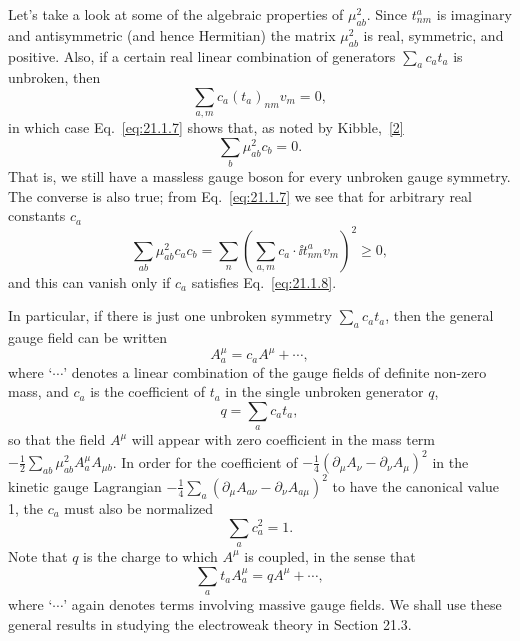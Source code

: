 Let's take a look at some of the algebraic properties of
$\mu^2_{ab}$. Since $t^a_{nm}$ is imaginary and antisymmetric
(and hence Hermitian) the matrix $\mu^2_{ab}$ is real, symmetric,
and positive. Also, if a certain real linear combination of generators
$\sum_a c_a t_a$ is unbroken, then
\begin{equation}
 \sum_{a,m}c_a(t_a)_{nm}v_m=0,
 \tag{21.1.8}\label{eq:21.1.8}
\end{equation}
in which case Eq.~\eqref{eq:21.1.7} shows that, as noted by
Kibble,~\hyperref[ch21-ref-2]{[2]}
\begin{equation}
 \sum_b\mu^2_{ab}c_b=0.
 \tag{21.1.9}\label{eq:21.1.9}
\end{equation}
That is, we still have a massless gauge boson for every unbroken gauge
symmetry. The converse is also true; from Eq.~\eqref{eq:21.1.7} we see that
for arbitrary real constants $c_a$
\begin{equation}
 \sum_{ab}\mu^2_{ab}c_a c_b
 =\sum_n\left(\sum_{a,m}
 c_a\cdot \ii t^a_{nm}v_m\right)^2\geq 0,
 \tag{21.1.10}\label{eq:21.1.10}
\end{equation}
and this can vanish only if $c_a$ satisfies Eq.~\eqref{eq:21.1.8}.

In particular, if there is just one unbroken symmetry
$\sum_a c_a t_a$, then the general gauge field can be written
\begin{equation}
 A_a^\mu=c_a A^\mu+\cdots,
 \tag{21.1.11}\label{eq:21.1.11}
\end{equation}
where `$\cdots$' denotes a linear combination of the gauge fields of
definite non-zero mass, and $c_a$ is the coefficient of $t_a$ in
the single unbroken generator $q$,
\begin{equation}
 q=\sum_a c_a t_a,
 \tag{21.1.12}\label{eq:21.1.12}
\end{equation}
so that the field $A^\mu$ will appear with zero coefficient in the mass
term $-\frac12\sum_{ab}\mu^2_{ab}
A_a^\mu A_{\mu b}$. In order for the coefficient of
$-\frac14(\partial_\mu A_\nu\allowbreak-\partial_\nu A_\mu)^2$ in the kinetic gauge
Lagrangian
$-\frac14\sum_a(\partial_\mu A_{a\nu}
\allowbreak-\partial_\nu A_{a\mu})^2$ to have the canonical value 1, the
$c_a$ must also be normalized
\begin{equation}
 \sum_a c_a^2=1.
 \tag{21.1.13}\label{eq:21.1.13}
\end{equation}
Note that $q$ is the charge to which $A^\mu$ is coupled, in the sense that
\begin{equation}
 \sum_a t_a A_a^\mu=qA^\mu+\cdots,
 \tag{21.1.14}\label{eq:21.1.14}
\end{equation}
where `$\cdots$' again denotes terms involving massive gauge fields. We
shall use these general results in studying the electroweak theory in
Section 21.3.

